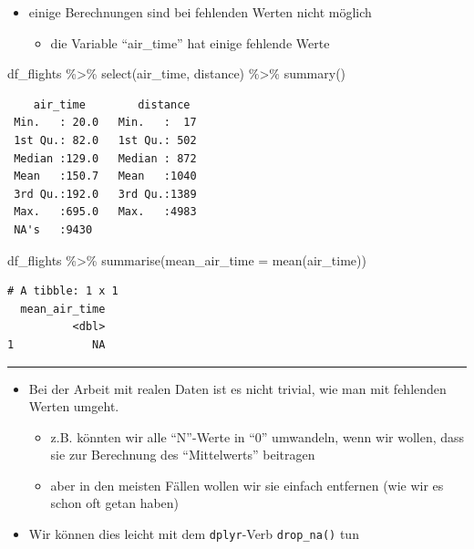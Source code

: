 \documentclass[
  letterpaper,
  DIV=11]{scrartcl}
\newenvironment{Shaded}{\begin{snugshade}}{\end{snugshade}}
\newcommand{\AttributeTok}[1]{\textcolor[rgb]{0.40,0.45,0.13}{#1}}
\newcommand{\FunctionTok}[1]{\textcolor[rgb]{0.28,0.35,0.67}{#1}}
\newcommand{\NormalTok}[1]{\textcolor[rgb]{0.00,0.23,0.31}{#1}}
\newcommand{\SpecialCharTok}[1]{\textcolor[rgb]{0.37,0.37,0.37}{#1}}
\providecommand{\tightlist}{%
  \setlength{\itemsep}{0pt}\setlength{\parskip}{0pt}}\usepackage{longtable,booktabs,array}
\begin{document}
\begin{itemize}
\tightlist
\item
  einige Berechnungen sind bei fehlenden Werten nicht möglich

  \begin{itemize}
  \tightlist
  \item
    die Variable ``air\_time'' hat einige fehlende Werte
  \end{itemize}
\end{itemize}

\begin{Shaded}
\begin{Highlighting}[]
\NormalTok{df\_flights }\SpecialCharTok{\%\textgreater{}\%} 
  \FunctionTok{select}\NormalTok{(air\_time, distance) }\SpecialCharTok{\%\textgreater{}\%} 
  \FunctionTok{summary}\NormalTok{()}
\end{Highlighting}
\end{Shaded}

\begin{verbatim}
    air_time        distance   
 Min.   : 20.0   Min.   :  17  
 1st Qu.: 82.0   1st Qu.: 502  
 Median :129.0   Median : 872  
 Mean   :150.7   Mean   :1040  
 3rd Qu.:192.0   3rd Qu.:1389  
 Max.   :695.0   Max.   :4983  
 NA's   :9430                  
\end{verbatim}

\begin{Shaded}
\begin{Highlighting}[]
\NormalTok{df\_flights }\SpecialCharTok{\%\textgreater{}\%} 
  \FunctionTok{summarise}\NormalTok{(}\AttributeTok{mean\_air\_time =} \FunctionTok{mean}\NormalTok{(air\_time))}
\end{Highlighting}
\end{Shaded}

\begin{verbatim}
# A tibble: 1 x 1
  mean_air_time
          <dbl>
1            NA
\end{verbatim}

\begin{center}\rule{0.5\linewidth}{0.5pt}\end{center}

\begin{itemize}
\tightlist
\item
  Bei der Arbeit mit realen Daten ist es nicht trivial, wie man mit
  fehlenden Werten umgeht.

  \begin{itemize}
  \tightlist
  \item
    z.B. könnten wir alle ``N''-Werte in ``0'' umwandeln, wenn wir
    wollen, dass sie zur Berechnung des ``Mittelwerts'' beitragen
  \item
    aber in den meisten Fällen wollen wir sie einfach entfernen (wie wir
    es schon oft getan haben)
  \end{itemize}
\item
  Wir können dies leicht mit dem \texttt{dplyr}-Verb \texttt{drop\_na()}
  tun
\end{itemize}
\end{document}
